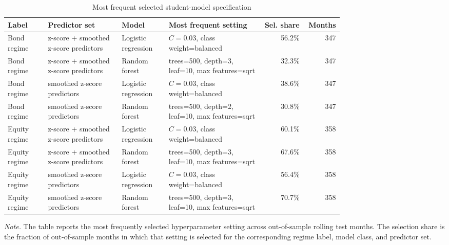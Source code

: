 \begin{table}[H]
\centering
\caption{Most frequent selected student-model specification}
\label{tab:app-student-selected-model-frequency}
\scriptsize
\setlength{\tabcolsep}{2.5pt}
\renewcommand{\arraystretch}{1.06}
\begin{tabular}{@{}>{\raggedright\arraybackslash}p{0.12\linewidth}>{\raggedright\arraybackslash}p{0.22\linewidth}>{\raggedright\arraybackslash}p{0.14\linewidth}>{\raggedright\arraybackslash}p{0.28\linewidth}rr@{}}
\toprule
Label & Predictor set & Model & Most frequent setting & Sel. share & Months \\
\midrule
Bond regime & z-score + smoothed z-score predictors & Logistic regression & $C=0.03$, class weight=balanced & 56.2\% & 347 \\
Bond regime & z-score + smoothed z-score predictors & Random forest & trees=500, depth=3, leaf=10, max features=sqrt & 32.3\% & 347 \\
Bond regime & smoothed z-score predictors & Logistic regression & $C=0.03$, class weight=balanced & 38.6\% & 347 \\
Bond regime & smoothed z-score predictors & Random forest & trees=500, depth=2, leaf=10, max features=sqrt & 30.8\% & 347 \\
Equity regime & z-score + smoothed z-score predictors & Logistic regression & $C=0.03$, class weight=balanced & 60.1\% & 358 \\
Equity regime & z-score + smoothed z-score predictors & Random forest & trees=500, depth=3, leaf=10, max features=sqrt & 67.6\% & 358 \\
Equity regime & smoothed z-score predictors & Logistic regression & $C=0.03$, class weight=balanced & 56.4\% & 358 \\
Equity regime & smoothed z-score predictors & Random forest & trees=500, depth=3, leaf=10, max features=sqrt & 70.7\% & 358 \\
\bottomrule
\end{tabular}
\vspace{0.45em}
\begin{minipage}{0.97\linewidth}
\footnotesize
\emph{Note.} The table reports the most frequently selected hyperparameter setting across out-of-sample rolling test months. The selection share is the fraction of out-of-sample months in which that setting is selected for the corresponding regime label, model class, and predictor set.
\end{minipage}
\end{table}

